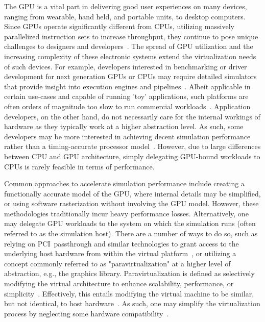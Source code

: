 The GPU is a vital part in delivering good user experiences on many devices, ranging from wearable, hand held, and portable units, to desktop computers.
Since GPUs operate significantly different from CPUs, utilizing massively parallelized instruction sets to increase throughput, they continue to pose unique challenges to designers and developers~.
The spread of GPU utilization and the increasing complexity of these electronic systems extend the virtualization needs of such devices.
For example, developers interested in benchmarking or driver development for next generation GPUs or CPUs may require detailed simulators that provide insight into execution engines and pipelines~.
Albeit applicable in certain use-cases and capable of running 'toy' applications, such platforms are often orders of magnitude too slow to run commercial workloads~.
Application developers, on the other hand, do not necessarily care for the internal workings of hardware as they typically work at a higher abstraction level.
As such, some developers may be more interested in achieving decent simulation performance rather than a timing-accurate processor model~.
However, due to large differences between CPU and GPU architecture, simply delegating GPU-bound workloads to CPUs is rarely feasible in terms of performance.

Common approaches to accelerate simulation performance include creating a functionally accurate model of the GPU, where internal details may be simplified, or using software rasterization without involving the GPU model.
However, these methodologies traditionally incur heavy performance losses.
Alternatively, one may delegate GPU workloads to the system on which the simulation runs (often referred to as the simulation host).
There are a number of ways to do so, such as relying on PCI~passthrough and similar technologies to grant access to the underlying host hardware from within the virtual platform~, or utilizing a concept commonly referred to as "paravirtualization" at a higher level of abstraction, e.g., the graphics library.
Paravirtualization is defined as selectively modifying the virtual architecture to enhance scalability, performance, or simplicity~.
Effectively, this entails modifying the virtual machine to be similar, but not identical, to host hardware~.
As such, one may simplify the virtualization process by neglecting some hardware compatibility~.

